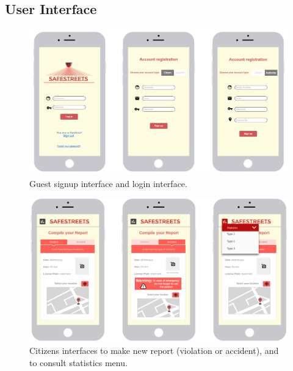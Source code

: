 \documentclass{report}
\begin{document}
\subsection{User Interface}
\begin{figure}[!ht]
	\begin{center}
	\includegraphics[width=\textwidth]{img/Mockup_logging.jpg}
	\end{center}
	\caption{Guest signup interface and login interface.}
\end{figure}

\begin{figure}[!ht]
	\begin{center}
	\includegraphics[width=\textwidth]{img/CitizensInterface.png}
	\end{center}
	\caption{Citizens interfaces to make new report (violation or accident), and to consult statistics menu.}
\end{figure}
\end{document}
